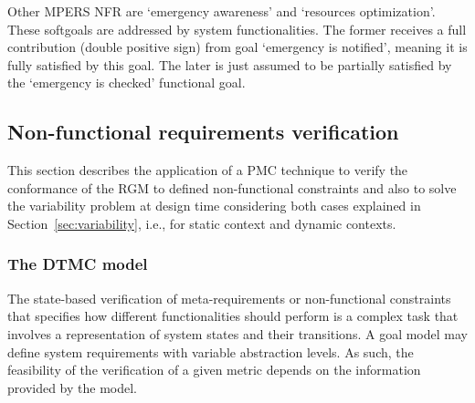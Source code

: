 
Other MPERS NFR are `emergency awareness' and `resources optimization'. These softgoals are addressed by system functionalities. The former receives a full contribution (double positive sign) from goal `emergency is notified', meaning it is fully satisfied by this goal. The later is just assumed to be partially satisfied by the `emergency is checked' functional goal.

\subsection{Non-functional requirements verification}



This section describes the application of a PMC technique to verify the conformance of the RGM to defined non-functional constraints and also to solve the variability problem at design time considering both cases explained in Section~\ref{sec:variability}, i.e., for static context and dynamic contexts.

\subsubsection{The DTMC model}


The state-based verification of meta-requirements or non-functional constraints that specifies how different functionalities should perform is a complex task that involves a representation of system states and their transitions. A goal model may define system requirements with variable abstraction levels. As such, the feasibility of the verification of a given metric depends on the information provided by the model.

